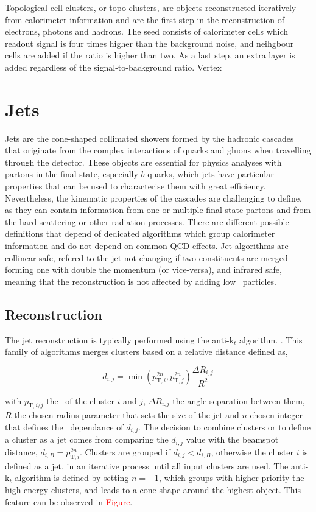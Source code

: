 Topological cell clusters, or topo-clusters, are objects reconstructed iteratively from calorimeter information and are the first step in the reconstruction of electrons, photons and hadrons. The seed consists of calorimeter cells which readout signal is four times higher than the background noise, and neihgbour cells are added if the ratio is higher than two. As a last step, an extra layer is added regardless of the signal-to-background ratio. 
Vertex

\section{Jets}

Jets are the cone-shaped collimated showers formed by the hadronic cascades that originate from the complex interactions of quarks and gluons when travelling through the detector. These objects are essential for physics analyses with partons in the final state, especially $b$-quarks, which jets have particular properties that can be used to characterise them with great efficiency. Nevertheless, the kinematic properties of the cascades are challenging to define, as they can contain information from one or multiple final state partons and from the hard-scattering or other radiation processes. There are different possible definitions that depend of dedicated algorithms which group calorimeter information and do not depend on common \acrshort{QCD} effects. Jet algorithms are collinear safe, refered to the jet not changing if two constituents are merged forming one with double the momentum (or vice-versa), and infrared safe, meaning that the reconstruction is not affected by adding low \pT\ particles.

\subsection{Reconstruction}

The jet reconstruction is typically performed using the anti-k$_t$ algorithm. %
. This family of algorithms merges clusters based on a relative distance defined as,

\begin{equation}
    d_{i,j} = \min (p_{\text{T},i}^{2n},p_{\text{T},j}^{2n}) \frac{\Delta R_{i,j}}{R^2}
\end{equation}

with $p_{\text{T},i/j}$ the \pT\ of the cluster $i$ and $j$, $\Delta R_{i,j}$ the angle separation between them, $R$ the chosen radius parameter that sets the size of the jet and $n$ chosen integer that defines the \pT\ dependance of $d_{i,j}$. The decision to combine clusters or to define a cluster as a jet comes from comparing the $d_{i,j}$ value with the beamspot distance, $d_{i,B} = p_{\text{T},i}^{2n}$. Clusters are grouped if $d_{i,j} < d_{i,B}$, otherwise the cluster $i$ is defined as a jet, in an iterative process until all input clusters are used. The anti-k$_t$ algorithm is defined by setting $n=-1$, which groups with higher priority the high energy clusters, and leads to a cone-shape around the highest object. This feature can be observed in \textcolor{red}{Figure}.


